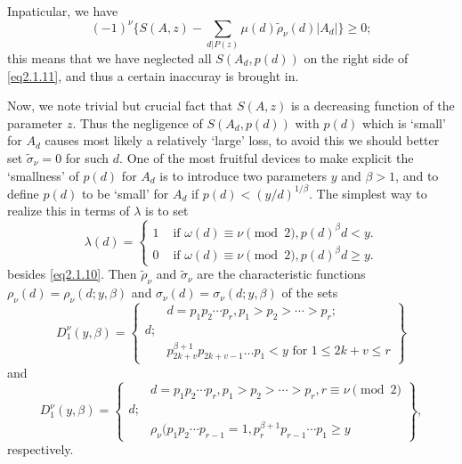   In\pageoriginale paticular, we have
  $$
  (-1)^\nu \{ S(A,z)- \sum_{d|P(z)} \mu (d) \tilde{\rho}_\nu (d) |A_d|\} \ge 0;
  $$ 
  this means that we have neglected all $S(A_d,p(d))$ on the right
  side of \eqref{eq2.1.11}, and thus a certain inaccuray is brought in. 
  
  Now, we note trivial but crucial fact that $S(A,z)$ is a decreasing
  function of the parameter $z$. Thus the negligence of $S(A_d,p(d))$
  with $p(d)$ which is `small' for $A_d$ causes most likely a
  relatively `large' loss, to avoid this we should better set
  $\tilde{\sigma}_\nu=0$ for such $d$. One of the most fruitful
  devices to make explicit the `smallness' of $p(d)$ for $A_d$ is to
  introduce two parameters $y$ and $\beta >1$, and to define $p(d)$ to
  be `small' for $A_d$ if $p(d) < (y/d)^{1/\beta}$. The simplest way
  to realize this in terms of $\lambda$ is to set  
  \begin{equation*}
    \lambda(d)=  
    \begin{cases}
      1 &\text{ if } \omega(d)\equiv \nu \pmod{2}, p(d)^\beta d < y.\\
      0 &\text{ if } \omega(d) \equiv \nu \pmod{2}, p(d)^{\beta}d \ge y.
    \end{cases}
  \end{equation*} 
   besides \eqref{eq2.1.10}. Then $\tilde{\rho}_\nu$ and $\tilde{\sigma}_\nu$
   are the characteristic functions $\rho_\nu (d) = \rho_\nu (d; y,
   \beta)$ and $\sigma_\nu (d)= \sigma_\nu(d; y, \beta)$ of the sets  
   \begin{equation*}
     D^{\nu}_1 (y, \beta ) = 
     \left\{ 
     \begin{aligned}   
       &d =p_1 p_2 \cdots p_r, p_1 > p_2 > \cdots > p_r ;\\
       d;\\
       &p^{\beta+1}_{2k+v} p_{2k+v-1}\ldots p_1 < y \text{ for } 1
       \leq 2k + v \leq r  
     \end{aligned}
     \right\}\tag{2.1.12}\label{eq2.1.12}
   \end{equation*}
and
\begin{equation*}
  D^{\nu}_1 (y, \beta ) = 
  \left\{ 
  \begin{aligned}   
    &d =p_1 p_2 \cdots p_r, p_1 > p_2 > \cdots > p_r, r \equiv \nu \pmod{2}\\
    d;\\
    &\rho_\nu(p_1p_2 \cdots p_{r-1} =1, p^{\beta+1}_r p_{r-1} \cdots p_1 \ge y 
  \end{aligned}
  \right\}, \tag{2.1.13}\label{eq2.1.13}
\end{equation*}\pageoriginale
respectively.

